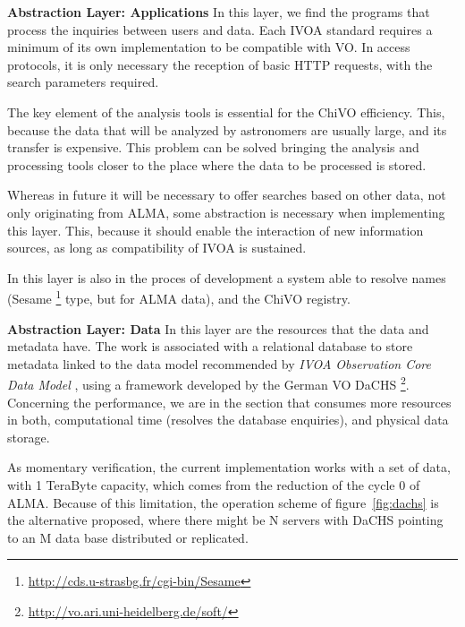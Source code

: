 \documentclass[]{spie}
\begin{document}
\textbf{Abstraction Layer:  Applications}
In this layer, we find the programs that process the inquiries between users and data.  Each IVOA standard requires a minimum of its own implementation to be compatible with VO.  In access protocols, it is only necessary the reception of basic HTTP requests, with the search parameters required.

The key element of the analysis tools is essential for the ChiVO efficiency.  This, because the data that will be analyzed by astronomers are usually large, and its transfer is expensive.  This problem can be solved bringing the analysis and processing tools closer to the place where the data to be processed is stored.

Whereas in future it will be necessary to offer searches based on other data, not only originating from ALMA, some abstraction is necessary when implementing this layer.  This, because it should enable the interaction of new information sources, as long as compatibility of IVOA is sustained.

In this layer is also in the proces of development a system able to resolve names (Sesame \footnote{\url{http://cds.u-strasbg.fr/cgi-bin/Sesame}} type, but for ALMA data), and the ChiVO registry.


\textbf{Abstraction Layer: Data}
In this layer are the resources that the data and metadata have.  The work is associated with a relational database to store metadata linked to the data model recommended by \emph{IVOA Observation Core Data Model} \cite{louys2011ivoa}, using a framework developed by the German VO DaCHS \footnote{\url{http://vo.ari.uni-heidelberg.de/soft/}}.  Concerning the performance, we are in the section that consumes more resources in both, computational time (resolves the database enquiries), and physical data storage.  

As momentary verification, the current implementation works with a set of data, with 1 TeraByte capacity, which comes from the reduction of the cycle 0 of ALMA.  Because of this limitation, the operation scheme of figure~\ref{fig:dachs} is the alternative proposed, where there might be N servers with DaCHS pointing to an M data base distributed or replicated.
\end{document}
